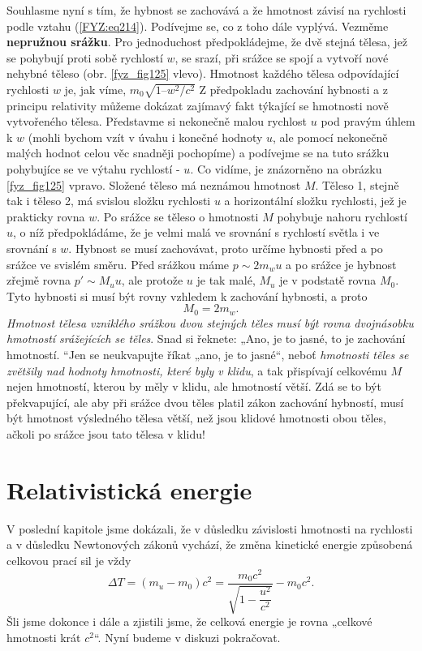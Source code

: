 {    Souhlasme nyní s tím, že hybnost se zachovává a že hmotnost závisí na rychlosti podle vztahu 
    (\ref{FYZ:eq214}). Podívejme se, co z toho dále vyplývá. Vezměme \textbf{nepružnou srážku}. Pro 
    jednoduchost předpokládejme, že dvě stejná tělesa, jež se pohybují proti sobě rychlostí \(w\), 
    se srazí, při srážce se spojí a vytvoří nové nehybné těleso (obr. \ref{fyz_fig125} vlevo). 
    Hmotnost každého tělesa odpovídající rychlosti \(w\) je, jak víme, \(m_0\sqrt{1 – w^2/c^2}\) Z 
    předpokladu zachování hybnosti a z principu relativity můžeme dokázat zajímavý fakt týkající se 
    hmotnosti nově vytvořeného tělesa. Představme si nekonečně malou rychlost \(u\) pod pravým 
    úhlem k \(w\) (mohli bychom vzít v úvahu i konečné hodnoty \(u\), ale pomocí nekonečně malých 
    hodnot celou věc snadněji pochopíme) a podívejme se na tuto srážku pohybujíce se ve výtahu 
    rychlostí - \(u\). Co vidíme, je znázorněno na obrázku \ref{fyz_fig125} vpravo. Složené těleso 
    má neznámou hmotnost \(M\). Těleso 1, stejně tak i těleso 2, má svislou složku rychlosti \(u\) 
    a horizontální složku rychlosti, jež je prakticky rovna \(w\). Po srážce se těleso o 
    hmotnosti \(M\) pohybuje nahoru rychlostí \(u\), o níž předpokládáme, že je velmi malá ve 
    srovnání s rychlostí světla i ve srovnání s \(w\). Hybnost se musí zachovávat, proto určíme 
    hybnosti před a po srážce ve svislém směru. Před srážkou máme \(p \sim 2m_wu\) a po srážce je 
    hybnost zřejmě rovna \(p' \sim M_uu\), ale protože \(u\) je tak malé, \(M_u\) je v podstatě 
    rovna \(M_0\). Tyto hybnosti si musí být rovny vzhledem k zachování hybnosti, a proto
    \begin{equation}\label{FYZ:eq216}
      M_0 = 2m_w.
    \end{equation}
    \emph{Hmotnost tělesa vzniklého srážkou dvou stejných těles musí být rovna dvojnásobku 
    hmotností srážejících se těles}. Snad si řeknete: „Ano, je to jasné, to je zachování hmotností. 
    “Jen se neukvapujte říkat „ano, je to jasné“, neboť \emph{hmotnosti těles se zvětšily nad 
    hodnoty hmotnosti, které byly v klidu}, a tak přispívají celkovému \(M\) nejen hmotností, 
    kterou by měly v klidu, ale hmotností větší. Zdá se to být překvapující, ale aby při srážce 
    dvou těles platil zákon zachování hybností, musí být hmotnost výsledného tělesa větší, než jsou 
    klidové hmotnosti obou těles, ačkoli po srážce jsou tato tělesa v klidu!
    
  \section{Relativistická energie}\label{fyz:IchapXVIsecV}
    V poslední kapitole jsme dokázali, že v důsledku závislosti hmotnosti na rychlosti a v důsledku 
    Newtonových zákonů vychází, že změna kinetické energie způsobená celkovou prací sil je vždy
    \begin{equation}\label{FYZ:eq217}
      \Delta T = (m_u - m_0)c^2 = \frac{m_0c^2}{\sqrt{1 - \dfrac{u^2}{c^2}}} - m_0c^2.
    \end{equation}
    Šli jsme dokonce i dále a zjistili jsme, že celková energie je rovna „celkové hmotnosti krát 
    \(c^2\)“. Nyní budeme v diskuzi pokračovat.
    
}
